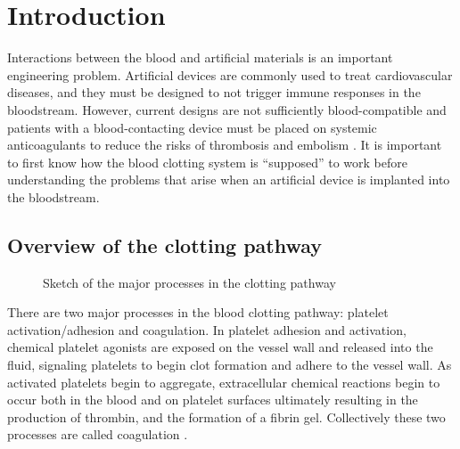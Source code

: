 
\chapter{Introduction}
\label{cha:introduction}


Interactions between the blood and artificial materials is an
important engineering problem. Artificial devices are commonly used to
treat cardiovascular diseases, and they must be designed to not
trigger immune responses in the bloodstream. However, current designs
are not sufficiently blood-compatible and patients with a
blood-contacting device must be placed on systemic anticoagulants to
reduce the risks of thrombosis and embolism
\cite{Ratner1993,Ratner2007,Oprea13}. %
It is important to first know
how the blood clotting system is ``supposed'' to work before
understanding the problems that arise when an artificial device is
implanted into the bloodstream.
	

\section{Overview of the clotting pathway}
\label{sec:overview-clotting}

\begin{figure}
  \centering
  
  \caption[The clotting pathway]{Sketch of the major processes in the
    clotting pathway}
  \label{fig:clot-path}
\end{figure}

There are two major processes in the blood clotting pathway: platelet
activation/adhesion and coagulation. In platelet adhesion and
activation, chemical platelet agonists are exposed on the vessel wall
and released into the fluid, signaling platelets to begin clot
formation and adhere to the vessel wall. As activated platelets begin
to aggregate, extracellular chemical reactions begin to occur both in
the blood and on platelet surfaces ultimately resulting in the
production of thrombin, and the formation of a fibrin
gel. Collectively these two processes are called coagulation
\cite{Fogelson2015}. 

